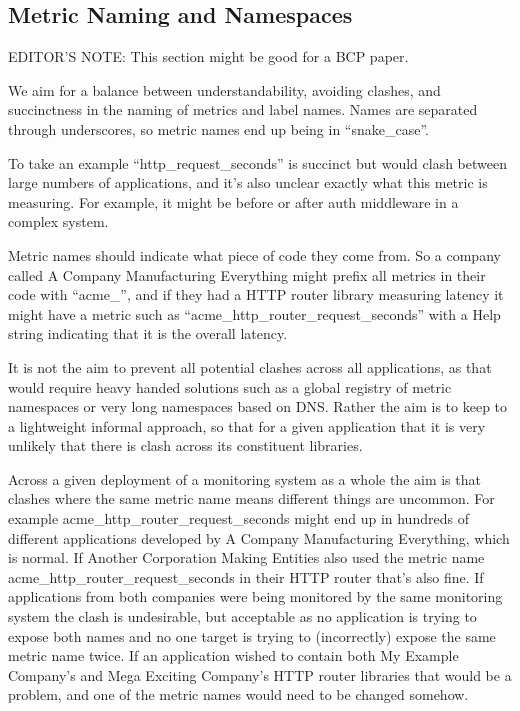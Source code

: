 \documentclass[a4paper,12pt,notitlepage,twoside,openright]{article}
\begin{document}
\hypertarget{metric-naming-and-namespaces}{%
\subsection{Metric Naming and
Namespaces}\label{metric-naming-and-namespaces}}

EDITOR'S NOTE: This section might be good for a BCP paper.

We aim for a balance between understandability, avoiding clashes, and
succinctness in the naming of metrics and label names. Names are
separated through underscores, so metric names end up being in
``snake\_case''.

To take an example ``http\_request\_seconds'' is succinct but would
clash between large numbers of applications, and it's also unclear
exactly what this metric is measuring. For example, it might be before
or after auth middleware in a complex system.

Metric names should indicate what piece of code they come from. So a
company called A Company Manufacturing Everything might prefix all
metrics in their code with ``acme\_'', and if they had a HTTP router
library measuring latency it might have a metric such as
``acme\_http\_router\_request\_seconds'' with a Help string indicating
that it is the overall latency.

It is not the aim to prevent all potential clashes across all
applications, as that would require heavy handed solutions such as a
global registry of metric namespaces or very long namespaces based on
DNS. Rather the aim is to keep to a lightweight informal approach, so
that for a given application that it is very unlikely that there is
clash across its constituent libraries.

Across a given deployment of a monitoring system as a whole the aim is
that clashes where the same metric name means different things are
uncommon. For example acme\_http\_router\_request\_seconds might end up
in hundreds of different applications developed by A Company
Manufacturing Everything, which is normal. If Another Corporation Making
Entities also used the metric name acme\_http\_router\_request\_seconds
in their HTTP router that's also fine. If applications from both
companies were being monitored by the same monitoring system the clash
is undesirable, but acceptable as no application is trying to expose
both names and no one target is trying to (incorrectly) expose the same
metric name twice. If an application wished to contain both My Example
Company's and Mega Exciting Company's HTTP router libraries that would
be a problem, and one of the metric names would need to be changed
somehow.
\end{document}
